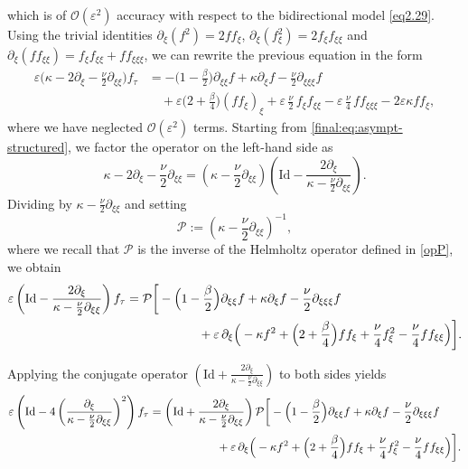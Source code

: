 \documentclass[reqno]{amsart}
\newcommand{\Id}{\mathrm{Id}}
\theoremstyle{definition}
\numberwithin{equation}{section}
\numberwithin{theorem}{section}
\numberwithin{definition}{section}
\begin{document}
which is of $\mathcal O(\varepsilon^2)$ accuracy with respect to the bidirectional model \eqref{eq2.29}.
Using the trivial identities $\partial_\xi(f^2)=2ff_\xi$, $\partial_\xi(f_\xi^2)=2f_\xi f_{\xi\xi}$ and
$\partial_\xi(ff_{\xi\xi})=f_\xi f_{\xi\xi}+ff_{\xi\xi\xi}$, we can rewrite the previous equation in the form
\begin{align}\label{final:eq:asympt-structured}
	\varepsilon\Big(\kappa-2\partial_\xi-\frac{\nu}{2}\partial_{\xi\xi}\Big)f_\tau
	&=
	-\Big(1-\frac{\beta}{2}\Big)\partial_{\xi\xi}f+\kappa\partial_\xi f-\frac{\nu}{2}\partial_{\xi\xi\xi}f \nonumber\\
	&\quad
	+\varepsilon\Big(2+\frac{\beta}{4}\Big)(ff_\xi)_\xi
	+\varepsilon\,\frac{\nu}{2}\, f_\xi f_{\xi\xi}
	-\varepsilon\,\frac{\nu}{4}\,f f_{\xi\xi\xi}
	-2\varepsilon\kappa f f_\xi ,
\end{align}
where we have neglected $\mathcal O(\varepsilon^2)$ terms. Starting from \eqref{final:eq:asympt-structured}, we factor the operator on the left-hand side as
\[
\kappa-2\partial_\xi-\frac{\nu}{2}\partial_{\xi\xi}
=\left(\kappa-\frac{\nu}{2}\partial_{\xi\xi}\right)\left(\Id-\frac{2\partial_\xi}{\kappa-\frac{\nu}{2}\partial_{\xi\xi}}\right).
\]
Dividing by $\kappa-\frac{\nu}{2}\partial_{\xi\xi}$ and setting
\[
\mathcal{P}:=\left(\kappa-\frac{\nu}{2}\partial_{\xi\xi}\right)^{-1},
\]
where we recall that $\mathcal{P}$ is the inverse of the Helmholtz operator defined in \eqref{opP}, we obtain
\begin{align}\label{eq:preM}
	\varepsilon\left(\Id-\frac{2\partial_{\xi}}{\kappa-\frac{\nu}{2}\partial_{\xi\xi}}\right)f_{\tau}
	&=\mathcal{P}\bigg[
	- \Big(1-\frac{\beta}{2}\Big)\partial_{\xi\xi}f+\kappa\partial_{\xi}f-\frac{\nu}{2}\partial_{\xi\xi\xi}f \nonumber\\
	&\hspace{2.05cm}
	+\varepsilon\,\partial_\xi\Big(
	-\kappa f^2+\Big(2+\frac{\beta}{4}\Big) f f_\xi
	+\frac{\nu}{4}f_\xi^2-\frac{\nu}{4}f f_{\xi\xi}
	\Big)\bigg].
\end{align}

Applying the conjugate operator $\left(\Id+\frac{2\partial_{\xi}}{\kappa-\frac{\nu}{2}\partial_{\xi\xi}}\right)$ to both sides yields
\begin{align}\label{eq:conjugate}
	\varepsilon\left(\Id-4\left(\frac{\partial_{\xi}}{\kappa-\frac{\nu}{2}\partial_{\xi\xi}}\right)^{2}\right)f_{\tau}
	&=\left(\Id+\frac{2\partial_{\xi}}{\kappa-\frac{\nu}{2}\partial_{\xi\xi}}\right)\mathcal{P}\bigg[
	- \Big(1-\frac{\beta}{2}\Big)\partial_{\xi\xi}f+\kappa\partial_{\xi}f-\frac{\nu}{2}\partial_{\xi\xi\xi}f \nonumber\\
	&\hspace{2.05cm}
	+\varepsilon\,\partial_\xi\Big(
	-\kappa f^2+\Big(2+\frac{\beta}{4}\Big) f f_\xi
	+\frac{\nu}{4}f_\xi^2-\frac{\nu}{4}f f_{\xi\xi}
	\Big)\bigg].
\end{align}
\end{document}
